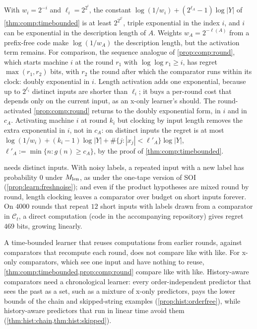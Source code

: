 \begin{remark}\label{rem:comp:constant}
With $w_i=2^{-i}$ and $\ell_i=2^{2^i}$, the constant $\log(1/w_i)+(2^{\ell_A}-1)\log|Y|$ of \cref{thm:comp:timebounded} is at least $2^{2^{2^i}}$, triple exponential in the index $i$, and $i$ can be exponential in the description length of $A$. Weights $w_A=2^{-\ell(A)}$ from a prefix-free code make $\log(1/w_A)$ the description length, but the activation term remains. For comparison, the sequence analogue of \cref{prop:comp:round}, which starts machine $i$ at the round $r_1$ with $\log\log r_1\ge i$, has regret $\max(r_1,r_2)$ bits, with $r_2$ the round after which the comparator runs within its clock: doubly exponential in $i$. Length activation adds one exponential, because up to $2^{\ell_i}$ distinct inputs are shorter than $\ell_i$; it buys a per-round cost that depends only on the current input, as an x-only learner's should. The round-activated \cref{prop:comp:round} returns to the doubly exponential form, in $i$ and in $c_A$. Activating machine $i$ at round $k_i$ but clocking by input length removes the extra exponential in $i$, not in $c_A$: on distinct inputs the regret is at most $\log(1/w_i)+(k_i-1)\log|Y|+\#\{j:|x_j|<\ell'_A\}\log|Y|$, $\ell'_A:=\min\{n:g(n)\ge c_A\}$, by the proof of \cref{thm:comp:timebounded}.
\end{remark}

\begin{remark}\label{rem:comp:distinct}
 needs distinct inputs. With noisy labels, a repeated input with a new label has probability $0$ under $M_{\mathrm{len}}$, as under the one-tape version of SOI (\cref{prop:learn:freshnoise}); and even if the product hypotheses are mixed round by round, length clocking leaves a comparator over budget on short inputs forever. On $4000$ rounds that repeat $12$ short inputs with labels drawn from a comparator in $\mathcal C_t$, a direct computation (code in the accompanying repository) gives regret $469$ bits, growing linearly.
\end{remark}

\begin{remark}\label{rem:comp:apples}
A time-bounded learner that reuses computations from earlier rounds, against comparators that recompute each round, does not compare like with like. For x-only comparators, which see one input and have nothing to reuse, \cref{thm:comp:timebounded,prop:comp:round} compare like with like. History-aware comparators need a chronological learner: every order-independent predictor that sees the past as a set, such as a mixture of x-only predictors, pays the lower bounds of the chain and skipped-string examples (\cref{prop:hist:orderfree}), while history-aware predictors that run in linear time avoid them (\cref{thm:hist:chain,thm:hist:skipped}).
\end{remark}

